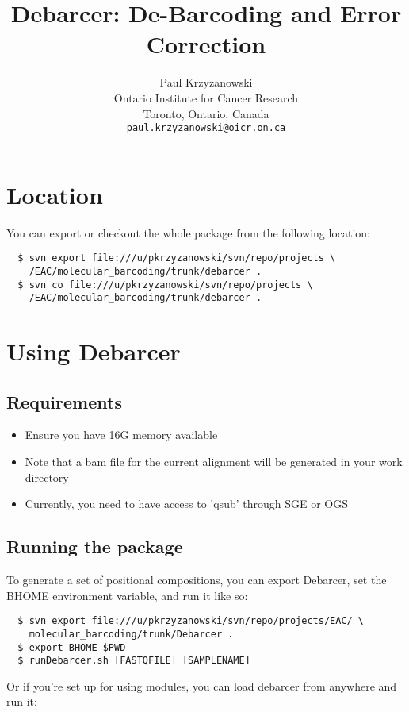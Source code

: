 \documentclass{article}
\title{Debarcer: De-Barcoding and Error Correction}
\author{Paul Krzyzanowski\\
  Ontario Institute for Cancer Research\\
  Toronto, Ontario, Canada\\
  \texttt{paul.krzyzanowski@oicr.on.ca}}
\begin{document}
\maketitle


\section{Location}

	You can export or checkout the whole package from the following location:

\begin{verbatim}
  $ svn export file:///u/pkrzyzanowski/svn/repo/projects \ 
	/EAC/molecular_barcoding/trunk/debarcer .
  $ svn co file:///u/pkrzyzanowski/svn/repo/projects \ 
	/EAC/molecular_barcoding/trunk/debarcer .
\end{verbatim}
  

\section{Using Debarcer}

\subsection{Requirements}

\begin{itemize}
  \item Ensure you have 16G memory available
  \item Note that a bam file for the current alignment will be generated in your work directory
  \item Currently, you need to have access to 'qsub' through SGE or OGS
\end{itemize}

\subsection{Running the package}

To generate a set of positional compositions, you can export 
Debarcer, set the BHOME environment variable, and run it like so:

\begin{verbatim}
  $ svn export file:///u/pkrzyzanowski/svn/repo/projects/EAC/ \ 
	molecular_barcoding/trunk/Debarcer .
  $ export BHOME $PWD
  $ runDebarcer.sh [FASTQFILE] [SAMPLENAME]
\end{verbatim}

Or if you're set up for using modules, you can load debarcer from anywhere and run it:
\end{document}
